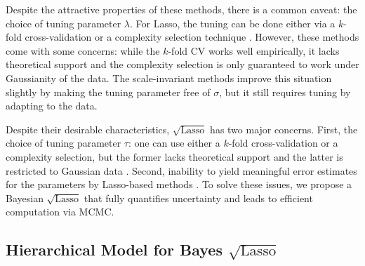 \documentclass[10pt]{article}
\def\sql{$\sqrt{\text{Lasso}}$}
\begin{document}
Despite the attractive properties of these methods, there is a common caveat: the choice of tuning parameter $\lambda$. For Lasso, the tuning can be done either via a $k$-fold cross-validation or a complexity selection technique \citep{giraud2012high}. However, these methods come with some concerns: while the $k$-fold CV works well empirically, it lacks theoretical support and the complexity selection is only guaranteed to work under Gaussianity of the data. The scale-invariant methods improve this situation slightly by making the tuning parameter free of $\sigma$, but it still requires tuning by adapting to the data. 
%

Despite their desirable characteristics, \sql{} has two major concerns. First, the choice of tuning parameter $\tau$: one can use either a $k$-fold cross-validation or a complexity selection, but the former lacks theoretical support and the latter is restricted to Gaussian data \citep{giraud2012high}. Second, inability to yield meaningful error estimates for the parameters by Lasso-based methods \citep{chatterjee2011bootstrap}. To solve these issues, we propose a Bayesian \sql{} that fully quantifies uncertainty and leads to efficient computation via MCMC.

\subsection{Hierarchical Model for Bayes \sql{}}
\end{document}
